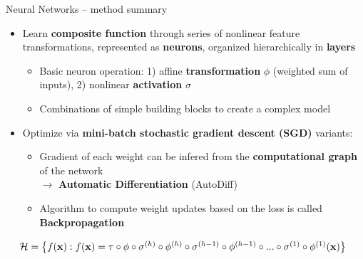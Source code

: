 

\begin{frame}{Neural Networks -- method summary}

 
 

\medskip

\begin{itemize}
  \item Learn \textbf{composite function} through series of nonlinear feature 
  transformations, represented as \textbf{neurons}, organized hierarchically 
  in \textbf{layers}
  \begin{itemize}
    \item Basic neuron operation: 1) affine \textbf{transformation} $\phi$ (weighted sum of inputs), 
    2) nonlinear \textbf{activation} $\sigma$
    \item Combinations of simple building 
    blocks to create a complex model
  \end{itemize}
  \item Optimize via \textbf{mini-batch stochastic gradient descent (SGD)} variants:
  \begin{itemize}
    \item Gradient of each weight can be infered from the \textbf{computational graph} of the network\\
    $\rightarrow$ \textbf{Automatic Differentiation} (AutoDiff)
    \item Algorithm to compute weight updates based on the loss is called \textbf{Backpropagation}
  \end{itemize}
\end{itemize}

\medskip
 
 ~~
$\mathcal{H} = \left\{ f(\mathbf{x}): f(\mathbf{x}) = \tau \circ \phi \circ \sigma^{(h)} \circ
\phi^{(h)} \circ \sigma^{(h - 1)} \circ \phi^{(h - 1)} \circ ... \circ 
\sigma^{(1)} \circ \phi^{(1)} (\mathbf{x}) \right\}$


\end{frame}
